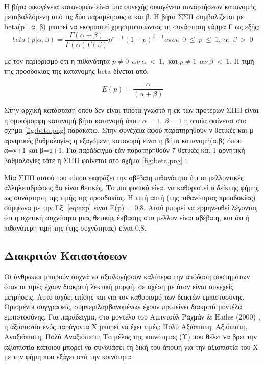 Η βήτα οικογένεια κατανομών είναι μια συνεχής οικογένεια συναρτήσεων κατανομής μεταβαλλόμενη από τις δύο παραμέτρους α και β. Η βήτα ΣΣΠ συμβολίζεται με beta(p | α, β) μπορεί να εκφραστεί χρησιμοποιώντας τη συνάρτηση γάμμα Γ ως εξής:
\begin{equation}
beta(p|\alpha,\beta)= \frac{\Gamma\left(\alpha + \beta\right)}{\Gamma\left(\alpha\right)\Gamma\left(\beta\right)}p^{\alpha−1}\left(1-p\right)^{\beta-1} o \pi o \upsilon\ \  0\  ≤\  p\  ≤\  1,\  \alpha,\  \beta\  >\  0
\label{eq:beta}
\end{equation}

με τον περιορισμό ότι η πιθανότητα $ p \neq 0 \ \  \alpha \nu \  \alpha \  <\ 1,$ και $ p \neq 1 \ \  \alpha \nu \  \beta \  <\ 1$.
Η τιμή της προσδοκίας της κατανομής beta δίνεται από:

\begin{equation}
E\left(p\right) = \frac{\alpha}{\left(\alpha+\beta\right)}
\label{eq:exp}
\end{equation}

Στην αρχική κατάσταση όπου δεν είναι τίποτα γνωστό η εκ των προτέρων ΣΠΠ είναι η ομοιόμορφη κατανομή βήτα κατανομή όπου $\alpha=1,\ \beta = 1$ η οποία φαίνεται στο σχήμα \ref{fig:beta.png}  παρακάτω. Στην συνέχεια αφού παρατηρηθούν ν θετικές και μ αρνητικές βαθμολογίες η εξαγόμενη κατανομή είναι η βήτα κατανομή(α,β) όπου α=ν+1 και β=μ+1. Για παράδειγμα εάν παρατηρηθούν 7 θετικές και 1 αρνητική βαθμολογίες τότε η ΣΠΠ φαίνεται στο σχήμα \ref{fig:beta.png} .


Μία ΣΠΠ αυτού του τύπου εκφράζει την αβέβαιη πιθανότητα ότι οι μελλοντικές αλληλεπιδράσεις θα είναι θετικές. Το πιο φυσικό είναι να καθοριστεί ο δείκτης φήμης ως συνάρτηση της τιμής της προσδοκίας. Η τιμή αυτή (της πιθανότητας προσδοκίας) σύμφωνα με την Εξ. \ref{eq:exp} είναι Ε(p) = 0,8. Αυτό μπορεί να ερμηνευθεί λέγοντας ότι η σχετική συχνότητα μιας θετικής έκβασης στο μέλλον είναι αβέβαιη, και ότι ή πιθανότερη τιμή της (της συχνότητας) είναι 0,8.

\subsection{ Διακριτών Καταστάσεων}

Οι άνθρωποι μπορούν συχνά να αξιολογήσουν καλύτερα την απόδοση συστημάτων όταν οι τιμές έχουν διακριτή λεκτική μορφή, σε σχέση με όταν είναι συνεχείς μετρήσεις. Αυτό ισχύει επίσης και για τον καθορισμό των δεικτών εμπιστοσύνης. Ορισμένοι συγγραφείς, συμπεριλαμβανομένων %
 έχουν προτείνει διακριτά μοντέλα εμπιστοσύνης. Για παράδειγμα, στο μοντέλο του Αμπντούλ Ραχμάν \& Hailes (2000) %
 , η αξιοπιστία ενός παράγοντα Χ μπορεί να έχει τιμές:
Πολύ Αξιόπιστη, Αξιόπιστη, Αναξιόπιστη, Πολύ Αναξιόπιστη
Το μέλος της κοινότητας (Υ) που θέλει να βρει την αξιοπιστία κάποιου μπορεί να συνδυάσει τη δική του άποψη  για την αξιοπιστία του Χ με την φήμη που εξάγει από την κοινότητα.
 
